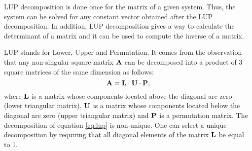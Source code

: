 \documentclass[twoside]{book}
\begin{document}
LUP decomposition is done once for the matrix of a given system.
Thus, the system can be solved for any constant vector obtained
after the LUP decomposition. In addition, LUP decomposition gives
a way to calculate the determinant of a matrix and it can be used
to compute the inverse of a matrix.

LUP stands for Lower, Upper and Permutation. It comes from the
observation that any non-singular square matrix ${\bf A}$ can be
decomposed into a product of 3 square matrices of the same
dimension as follows:
\begin{equation}
\label{eq:lup}
  {\bf A}={\bf L}\cdot{\bf U}\cdot{\bf P},
\end{equation}
where ${\bf L}$ is a matrix whose components located above the
diagonal are zero (lower triangular matrix), ${\bf U}$ is a matrix
whose components located below the diagonal are zero (upper
triangular matrix) and ${\bf P}$ is a permutation matrix. The
decomposition of equation \ref{eq:lup} is non-unique. One can
select a unique decomposition by requiring that all diagonal
elements of the matrix ${\bf L}$ be equal to 1.
\end{document}
